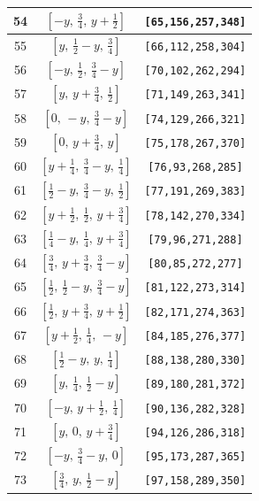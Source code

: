 \documentclass[fleqn,8pt]{jsarticle}
\begin{document}
\begin{longtable}{ccc}
54 & $\left[ - y,\, \frac{3}{4},\, y + \frac{1}{2} \right]$ & {\tt [65,156,257,348]} \\ \hline
55 & $\left[ y,\, \frac{1}{2} - y,\, \frac{3}{4} \right]$ & {\tt [66,112,258,304]} \\ \hline
56 & $\left[ - y,\, \frac{1}{2},\, \frac{3}{4} - y \right]$ & {\tt [70,102,262,294]} \\ \hline
57 & $\left[ y,\, y + \frac{3}{4},\, \frac{1}{2} \right]$ & {\tt [71,149,263,341]} \\ \hline
58 & $\left[ 0,\, - y,\, \frac{3}{4} - y \right]$ & {\tt [74,129,266,321]} \\ \hline
59 & $\left[ 0,\, y + \frac{3}{4},\, y \right]$ & {\tt [75,178,267,370]} \\ \hline
60 & $\left[ y + \frac{1}{4},\, \frac{3}{4} - y,\, \frac{1}{4} \right]$ & {\tt [76,93,268,285]} \\ \hline
61 & $\left[ \frac{1}{2} - y,\, \frac{3}{4} - y,\, \frac{1}{2} \right]$ & {\tt [77,191,269,383]} \\ \hline
62 & $\left[ y + \frac{1}{2},\, \frac{1}{2},\, y + \frac{3}{4} \right]$ & {\tt [78,142,270,334]} \\ \hline
63 & $\left[ \frac{1}{4} - y,\, \frac{1}{4},\, y + \frac{3}{4} \right]$ & {\tt [79,96,271,288]} \\ \hline
64 & $\left[ \frac{3}{4},\, y + \frac{3}{4},\, \frac{3}{4} - y \right]$ & {\tt [80,85,272,277]} \\ \hline
65 & $\left[ \frac{1}{2},\, \frac{1}{2} - y,\, \frac{3}{4} - y \right]$ & {\tt [81,122,273,314]} \\ \hline
66 & $\left[ \frac{1}{2},\, y + \frac{3}{4},\, y + \frac{1}{2} \right]$ & {\tt [82,171,274,363]} \\ \hline
67 & $\left[ y + \frac{1}{2},\, \frac{1}{4},\, - y \right]$ & {\tt [84,185,276,377]} \\ \hline
68 & $\left[ \frac{1}{2} - y,\, y,\, \frac{1}{4} \right]$ & {\tt [88,138,280,330]} \\ \hline
69 & $\left[ y,\, \frac{1}{4},\, \frac{1}{2} - y \right]$ & {\tt [89,180,281,372]} \\ \hline
70 & $\left[ - y,\, y + \frac{1}{2},\, \frac{1}{4} \right]$ & {\tt [90,136,282,328]} \\ \hline
71 & $\left[ y,\, 0,\, y + \frac{3}{4} \right]$ & {\tt [94,126,286,318]} \\ \hline
72 & $\left[ - y,\, \frac{3}{4} - y,\, 0 \right]$ & {\tt [95,173,287,365]} \\ \hline
73 & $\left[ \frac{3}{4},\, y,\, \frac{1}{2} - y \right]$ & {\tt [97,158,289,350]} \\ \hline

\end{longtable}
\end{document}

